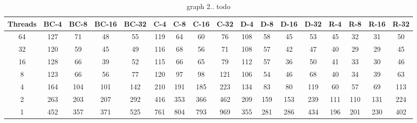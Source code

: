 \onecolumngrid
\begin{table}
{\scriptsize
\begin{tabular}{||c||c|c|c|c||c|c|c|c||c|c|c|c||c|c|c|c|}
\hline
\textbf{Threads}	&\cellcolor{black!10}BC-4&	\cellcolor{black!10}BC-8	&\cellcolor{black!10}BC-16	&\cellcolor{black!10}BC-32&	\cellcolor{black!10}C-4	&\cellcolor{black!10}C-8&	\cellcolor{black!10}C-16&	\cellcolor{black!10}C-32&	\cellcolor{black!10}D-4&	\cellcolor{black!10}D-8	&\cellcolor{black!10}D-16&\cellcolor{black!10}	D-32&	\cellcolor{black!10}R-4	&\cellcolor{black!10}R-8&	\cellcolor{black!10}R-16&	\cellcolor{black!10}R-32 \\ \hline \hline
64		&127	&71	&48	&55	&119	&64	&60	&76	&108	&58	&45	&53	&45	&32	&31	&50		 \\ \hline		
32		&120	&59	&45	&49	&116	&68	&56	&71	&108	&57	&42	&47	&40	&29	&29	&45		 \\ \hline			
16		&128	&66	&39	&52	&115	&66	&65	&79	&112	&57	&36	&50	&41	&33	&30	&46 \\ \hline				
8		&123	&66	&56	&77	&120	&97	&98	&121	&106	&54	&46	&68	&40	&34	&39	&63	 \\ \hline			
4		&164	&104	&101	&142	&210	&191	&185	&223	&134	&83	&80	&119	&60	&57	&69	&113	 \\ \hline			
2		&263	&203	&207	&292	&416	&353	&366	&462	&209	&159	&153	&239	&111	&110	&131	&224	 \\ \hline		
1		&452&357	&371	&525	&761	&804	&793	&969	&355	&281	&286	&434	&196	&201	&230	&402 \\ \hline		
\end{tabular}
}
\label{tab:graph4}
\caption{graph 2.. todo}
\end{table}
\twocolumngrid


